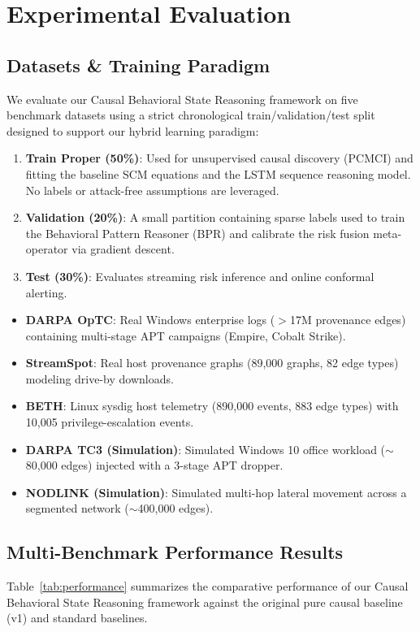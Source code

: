 \section{Experimental Evaluation}

\subsection{Datasets \& Training Paradigm}
We evaluate our Causal Behavioral State Reasoning framework on five benchmark datasets using a strict chronological train/validation/test split designed to support our hybrid learning paradigm:
\begin{enumerate}
\item \textbf{Train Proper (50\%)}: Used for unsupervised causal discovery (PCMCI) and fitting the baseline SCM equations and the LSTM sequence reasoning model. No labels or attack-free assumptions are leveraged.
\item \textbf{Validation (20\%)}: A small partition containing sparse labels used to train the Behavioral Pattern Reasoner (BPR) and calibrate the risk fusion meta-operator via gradient descent.
\item \textbf{Test (30\%)}: Evaluates streaming risk inference and online conformal alerting.
\end{enumerate}

\begin{itemize}
\item \textbf{DARPA OpTC}: Real Windows enterprise logs ($>$17M provenance edges) containing multi-stage APT campaigns (Empire, Cobalt Strike).
\item \textbf{StreamSpot}: Real host provenance graphs (89,000 graphs, 82 edge types) modeling drive-by downloads.
\item \textbf{BETH}: Linux sysdig host telemetry (890,000 events, 883 edge types) with 10,005 privilege-escalation events.
\item \textbf{DARPA TC3 (Simulation)}: Simulated Windows 10 office workload ($\sim$80,000 edges) injected with a 3-stage APT dropper.
\item \textbf{NODLINK (Simulation)}: Simulated multi-hop lateral movement across a segmented network ($\sim$400,000 edges).
\end{itemize}

\subsection{Multi-Benchmark Performance Results}
Table~\ref{tab:performance} summarizes the comparative performance of our Causal Behavioral State Reasoning framework against the original pure causal baseline (v1) and standard baselines.

